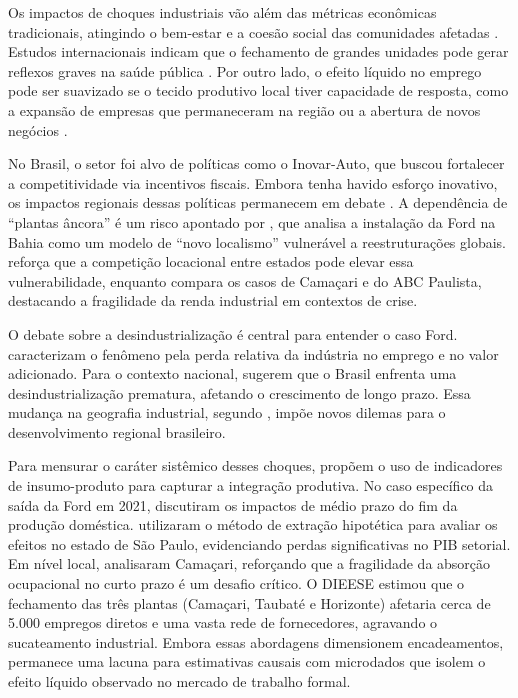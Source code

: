 \documentclass[12pt,a4paper]{article}
\begin{document}
Os impactos de choques industriais v\~ao al\'em das m\'etricas econ\^omicas tradicionais, atingindo o bem-estar e a coes\~ao social das comunidades afetadas \parencite{beer2019,chapain2008}. Estudos internacionais indicam que o fechamento de grandes unidades pode gerar reflexos graves na sa\'ude p\'ublica \parencite{venkataramani2020}. Por outro lado, o efeito l\'iquido no emprego pode ser suavizado se o tecido produtivo local tiver capacidade de resposta, como a expans\~ao de empresas que permaneceram na regi\~ao ou a abertura de novos neg\'ocios \parencite{jofremonseny2018}.

No Brasil, o setor foi alvo de pol\'iticas como o Inovar-Auto, que buscou fortalecer a competitividade via incentivos fiscais. Embora tenha havido esfor\c{c}o inovativo, os impactos regionais dessas pol\'iticas permanecem em debate \parencite{vargas2024}. A depend\^encia de ``plantas \^ancora'' \'e um risco apontado por \textcite{franco2009}, que analisa a instala\c{c}\~ao da Ford na Bahia como um modelo de ``novo localismo'' vulner\'avel a reestrutura\c{c}\~oes globais. \textcite{teixeira2016} refor\c{c}a que a competi\c{c}\~ao locacional entre estados pode elevar essa vulnerabilidade, enquanto \textcite{dulci2021} compara os casos de Cama\c{c}ari e do ABC Paulista, destacando a fragilidade da renda industrial em contextos de crise.

O debate sobre a desindustrializa\c{c}\~ao \'e central para entender o caso Ford. \textcite{rowthorn1999} caracterizam o fen\^omeno pela perda relativa da ind\'ustria no emprego e no valor adicionado. Para o contexto nacional, \textcite{verissimo2015} sugerem que o Brasil enfrenta uma desindustrializa\c{c}\~ao prematura, afetando o crescimento de longo prazo. Essa mudan\c{c}a na geografia industrial, segundo \textcite{monteiro2022}, imp\~oe novos dilemas para o desenvolvimento regional brasileiro.

Para mensurar o car\'ater sist\^emico desses choques, \textcite{perobelli2017} prop\~oem o uso de indicadores de insumo-produto para capturar a integra\c{c}\~ao produtiva. No caso espec\'ifico da sa\'ida da Ford em 2021, \textcite{domingues2020} discutiram os impactos de m\'edio prazo do fim da produ\c{c}\~ao dom\'estica. \textcite{fernandes2021} utilizaram o m\'etodo de extra\c{c}\~ao hipot\'etica para avaliar os efeitos no estado de S\~ao Paulo, evidenciando perdas significativas no PIB setorial. Em n\'ivel local, \textcite{henriques2024} analisaram Cama\c{c}ari, refor\c{c}ando que a fragilidade da absor\c{c}\~ao ocupacional no curto prazo \'e um desafio cr\'itico. O DIEESE \parencite{dieese2021} estimou que o fechamento das tr\^es plantas (Cama\c{c}ari, Taubat\'e e Horizonte) afetaria cerca de 5.000 empregos diretos e uma vasta rede de fornecedores, agravando o sucateamento industrial. Embora essas abordagens dimensionem encadeamentos, permanece uma lacuna para estimativas causais com microdados que isolem o efeito l\'iquido observado no mercado de trabalho formal.
\end{document}

